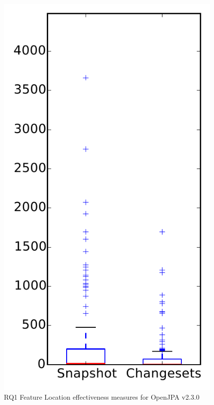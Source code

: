 
\begin{figure}
\centering
\includegraphics[height=0.4\textheight]{figures/flt/rq1_openjpa}
\caption{RQ1 Feature Location effectiveness measures for OpenJPA v2.3.0}
\label{fig:flt:rq1:openjpa}
\end{figure}
